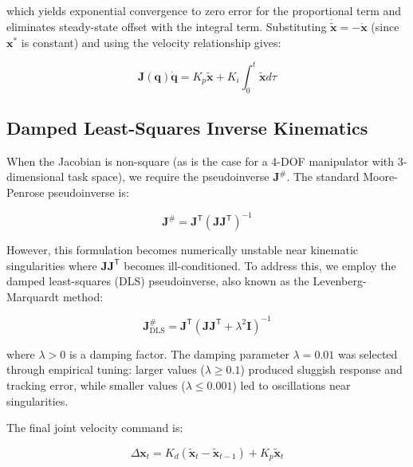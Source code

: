 \documentclass[12pt,a4paper,oneside]{report}
\begin{document}
which yields exponential convergence to zero error for the proportional term and eliminates steady-state offset with the integral term. Substituting $\dot{\tilde{\mathbf{x}}} = -\dot{\mathbf{x}}$ (since $\mathbf{x}^*$ is constant) and using the velocity relationship gives:

\begin{equation}
\mathbf{J}(\mathbf{q}) \dot{\mathbf{q}} = K_p \tilde{\mathbf{x}} + K_i \int_0^t \tilde{\mathbf{x}} d\tau
\end{equation}

\subsection{Damped Least-Squares Inverse Kinematics}
\label{subsec:damped_least_squares_inverse_kinematics}

When the Jacobian is non-square (as is the case for a 4-DOF manipulator with 3-dimensional task space), we require the pseudoinverse $\mathbf{J}^{\#}$. The standard Moore-Penrose pseudoinverse is:

\begin{equation}
\mathbf{J}^{\#} = \mathbf{J}^{\mathsf{T}} (\mathbf{J} \mathbf{J}^{\mathsf{T}})^{-1}
\end{equation}

However, this formulation becomes numerically unstable near kinematic singularities where $\mathbf{J} \mathbf{J}^{\mathsf{T}}$ becomes ill-conditioned. To address this, we employ the damped least-squares (DLS) pseudoinverse, also known as the Levenberg-Marquardt method:

\begin{equation}
\mathbf{J}^{\#}_{\text{DLS}} = \mathbf{J}^{\mathsf{T}} (\mathbf{J} \mathbf{J}^{\mathsf{T}} + \lambda^2 \mathbf{I})^{-1}
\end{equation}

where $\lambda > 0$ is a damping factor. The damping parameter $\lambda = 0.01$ was selected through empirical tuning: larger values ($\lambda \geq 0.1$) produced sluggish response and tracking error, while smaller values ($\lambda \leq 0.001$) led to oscillations near singularities.

The final joint velocity command is:

\begin{equation}
\Delta \mathbf{x}_t = K_d (\tilde{\mathbf{x}}_t - \tilde{\mathbf{x}}_{t-1}) + K_p \tilde{\mathbf{x}}_t
\end{equation}
\end{document}
